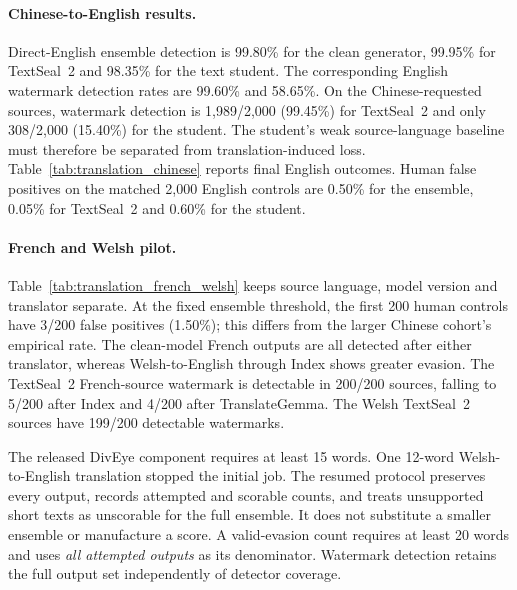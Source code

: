 \paragraph{Chinese-to-English results.}
Direct-English ensemble detection is 99.80\% for the clean generator,
99.95\% for TextSeal~2 and 98.35\% for the text student. The corresponding
English watermark detection rates are 99.60\% and 58.65\%. On the
Chinese-requested sources, watermark detection is 1,989/2,000 (99.45\%) for
TextSeal~2 and only 308/2,000 (15.40\%) for the student. The student's weak
source-language baseline must therefore be separated from translation-induced
loss. Table~\ref{tab:translation_chinese} reports final English outcomes.
Human false positives on the matched 2,000 English controls are 0.50\% for
the ensemble, 0.05\% for TextSeal~2 and 0.60\% for the student.



\paragraph{French and Welsh pilot.}
Table~\ref{tab:translation_french_welsh} keeps source language, model version
and translator separate. At the fixed ensemble threshold, the first 200 human
controls have 3/200 false positives (1.50\%); this differs from the larger
Chinese cohort's empirical rate. The clean-model French outputs are all
detected after either translator, whereas Welsh-to-English through Index
shows greater evasion. The TextSeal~2 French-source watermark is detectable in
200/200 sources, falling to 5/200 after Index and 4/200 after TranslateGemma.
The Welsh TextSeal~2 sources have 199/200 detectable watermarks.

The released DivEye component requires at least 15 words. One 12-word
Welsh-to-English translation stopped the initial job. The resumed protocol
preserves every output, records attempted and scorable counts, and treats
unsupported short texts as unscorable for the full ensemble. It does not
substitute a smaller ensemble or manufacture a score. A valid-evasion count
requires at least 20 words and uses \emph{all attempted outputs} as its
denominator. Watermark detection retains the full output set independently
of detector coverage.



